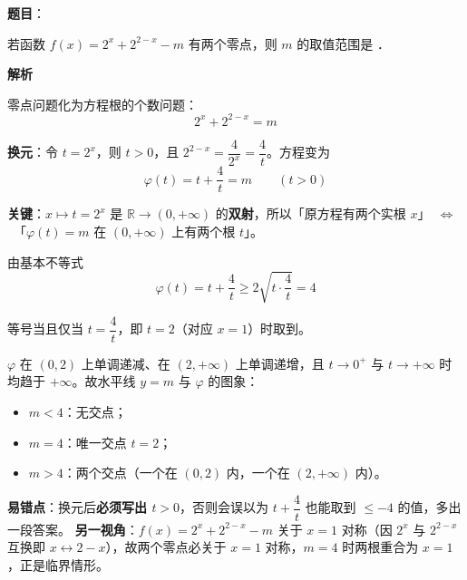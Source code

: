 \begin{answer}

\textbf{题目}：

若函数 $f(x)=2^x+2^{2-x}-m$ 有两个零点，则 $m$ 的取值范围是 \gkblank{}．

\textbf{解析}

零点问题化为方程根的个数问题：
\nopagebreak[4]
\[2^x+2^{2-x}=m\]

\textbf{换元}：令 $t=2^x$，则 $t>0$，且 $2^{2-x}=\dfrac{4}{2^x}=\dfrac{4}{t}$。方程变为
\nopagebreak[4]
\[\varphi(t)=t+\frac4t=m\qquad(t>0)\]

\textbf{关键}：$x\mapsto t=2^x$ 是 $\mathbb{R}\to(0,+\infty)$ 的\textbf{双射}，所以「原方程有两个实根 $x$」~$\Longleftrightarrow$~「$\varphi(t)=m$ 在 $(0,+\infty)$ 上有两个根 $t$」。

由基本不等式
\nopagebreak[4]
\[\varphi(t)=t+\frac4t\ge2\sqrt{t\cdot\frac4t}=4\]

等号当且仅当 $t=\dfrac4t$，即 $t=2$（对应 $x=1$）时取到。

$\varphi$ 在 $(0,2)$ 上单调递减、在 $(2,+\infty)$ 上单调递增，且 $t\to0^+$ 与 $t\to+\infty$ 时均趋于 $+\infty$。故水平线 $y=m$ 与 $\varphi$ 的图象：
\begin{itemize}
\item $m<4$：无交点；
\item $m=4$：唯一交点 $t=2$；
\item $m>4$：两个交点（一个在 $(0,2)$ 内，一个在 $(2,+\infty)$ 内）。
\end{itemize}

\begin{gktip}
\textbf{易错点}：换元后\textbf{必须写出 $t>0$}，否则会误以为 $t+\dfrac4t$ 也能取到 $\le-4$ 的值，多出一段答案。
\textbf{另一视角}：$f(x)=2^x+2^{2-x}-m$ 关于 $x=1$ 对称（因 $2^x$ 与 $2^{2-x}$ 互换即 $x\leftrightarrow2-x$），故两个零点必关于 $x=1$ 对称，$m=4$ 时两根重合为 $x=1$，正是临界情形。
\end{gktip}


\par\medskip

\end{answer}
